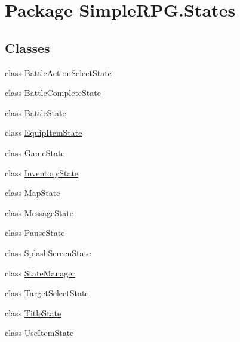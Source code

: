\hypertarget{namespace_simple_r_p_g_1_1_states}{\section{Package Simple\-R\-P\-G.\-States}
\label{namespace_simple_r_p_g_1_1_states}
}
\subsection*{Classes}
\begin{DoxyCompactItemize}
\item 
class \hyperlink{class_simple_r_p_g_1_1_states_1_1_battle_action_select_state}{Battle\-Action\-Select\-State}
\item 
class \hyperlink{class_simple_r_p_g_1_1_states_1_1_battle_complete_state}{Battle\-Complete\-State}
\item 
class \hyperlink{class_simple_r_p_g_1_1_states_1_1_battle_state}{Battle\-State}
\item 
class \hyperlink{class_simple_r_p_g_1_1_states_1_1_equip_item_state}{Equip\-Item\-State}
\item 
class \hyperlink{class_simple_r_p_g_1_1_states_1_1_game_state}{Game\-State}
\item 
class \hyperlink{class_simple_r_p_g_1_1_states_1_1_inventory_state}{Inventory\-State}
\item 
class \hyperlink{class_simple_r_p_g_1_1_states_1_1_map_state}{Map\-State}
\item 
class \hyperlink{class_simple_r_p_g_1_1_states_1_1_message_state}{Message\-State}
\item 
class \hyperlink{class_simple_r_p_g_1_1_states_1_1_pause_state}{Pause\-State}
\item 
class \hyperlink{class_simple_r_p_g_1_1_states_1_1_splash_screen_state}{Splash\-Screen\-State}
\item 
class \hyperlink{class_simple_r_p_g_1_1_states_1_1_state_manager}{State\-Manager}
\item 
class \hyperlink{class_simple_r_p_g_1_1_states_1_1_target_select_state}{Target\-Select\-State}
\item 
class \hyperlink{class_simple_r_p_g_1_1_states_1_1_title_state}{Title\-State}
\item 
class \hyperlink{class_simple_r_p_g_1_1_states_1_1_use_item_state}{Use\-Item\-State}
\end{DoxyCompactItemize}
